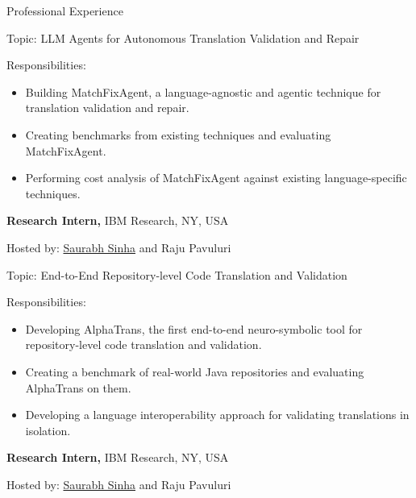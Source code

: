 \begin{rubric}{Professional Experience}
        \par Topic: LLM Agents for Autonomous Translation Validation and Repair

        \par Responsibilities:

        \begin{itemize}[leftmargin=*, noitemsep, topsep=0pt]

            \item Building MatchFixAgent, a language-agnostic and agentic technique for translation validation and repair.

            \item Creating benchmarks from existing techniques and evaluating MatchFixAgent.

            \item Performing cost analysis of MatchFixAgent against existing language-specific techniques.

        \end{itemize}
        
\entry*[05/24 -- 08/24]%
	\textbf{Research Intern,} IBM Research, NY, USA

        \par Hosted by: \href{https://research.ibm.com/people/saurabh-sinha}{Saurabh Sinha} and Raju Pavuluri
        
        \par Topic: End-to-End Repository-level Code Translation and Validation

        \par Responsibilities:

        \begin{itemize}[leftmargin=*, noitemsep, topsep=0pt]

            \item Developing AlphaTrans, the first end-to-end neuro-symbolic tool for repository-level code translation and validation.

            \item Creating a benchmark of real-world Java repositories and evaluating AlphaTrans on them.

            \item Developing a language interoperability approach for validating translations in isolation. 

        \end{itemize}
\entry*[05/23 -- 08/23]%
	\textbf{Research Intern,} IBM Research, NY, USA

        \par Hosted by: \href{https://research.ibm.com/people/saurabh-sinha}{Saurabh Sinha} and Raju Pavuluri
        

\end{rubric}
